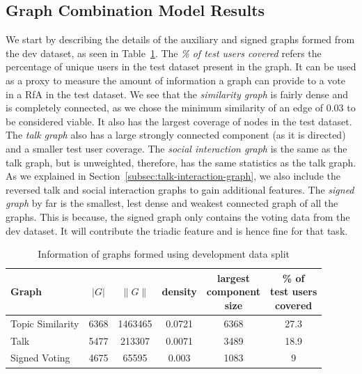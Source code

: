 \subsection{Graph Combination Model Results}
We start by describing the details of the auxiliary and signed graphs formed from the dev dataset, as seen in Table~\ref{tab:test-graphs}.
The \textit{\% of test users covered} refers the percentage of unique users in the test dataset present in the graph. 
It can be used as a proxy to measure the amount of information a graph can provide to a vote in a RfA in the test dataset.
We see that the \textit{similarity graph} is fairly dense and is completely connected, as we chose the minimum similarity of an edge of $0.03$ to be considered viable.
It also has the largest coverage of nodes in the test dataset.
The \textit{talk graph} also has a large strongly connected component (as it is directed) and a smaller test user coverage.
The \textit{social interaction graph} is the same as the talk graph, but is unweighted, therefore, has the same statistics as the talk graph.
As we explained in Section~\ref{subsec:talk-interaction-graph}, we also include the reversed talk and social interaction graphs to gain additional features.
The \textit{signed graph} by far is the smallest, lest dense and weakest connected graph of all the graphs.
This is because, the signed graph only contains the voting data from the dev dataset.
It will contribute the triadic feature and is hence fine for that task.

\begin{table}[htp]
    \centering
    \caption{Information of graphs formed using development data split}
    \label{tab:test-graphs}
    \begin{tabular}{lccccc}
        \toprule
        Graph & $|G|$ & $\|G\|$ & density & \shortstack{largest\\  component \\size} & \shortstack{\% of \\test users\\ covered}\\ 
        \midrule
        
        Topic Similarity & 6368 &1463465 & 0.0721 & 6368 & 27.3\\
        
        Talk  & 5477 & 213307 & 0.0071 & 3489 & 18.9\\

        Signed Voting & 4675 & 65595 & 0.003 & 1083 & 9\\

        \bottomrule
        \end{tabular}
\end{table}

